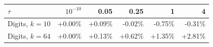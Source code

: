 \begin{tabular}{lrrrrr}
\toprule
$\tau$ & $10^{-10}$ & 0.05 & 0.25 & 1 & 4 \\
\midrule
Digits, $k{=}10$ & +0.00\% & +0.09\% & -0.02\% & -0.75\% & -0.31\% \\
Digits, $k{=}64$ & +0.00\% & +0.13\% & +0.62\% & +1.35\% & +2.81\% \\
\bottomrule
\end{tabular}
